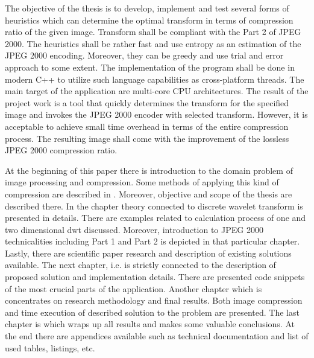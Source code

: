 The objective of the thesis is to develop, implement and test several forms of heuristics which can determine
the optimal transform in terms of compression ratio of the given image. Transform shall be compliant with
the Part 2 of JPEG 2000. The heuristics shall be rather fast and use entropy as an estimation of the JPEG 2000 encoding.
Moreover, they can be greedy and use trial and error approach to some extent. The implementation of the program
shall be done in modern C++ to utilize such language capabilities as cross-platform threads. The main target of the
application are multi-core CPU architectures. The result of the project work is a tool that quickly determines 
the transform for the specified image and invokes the JPEG 2000 encoder with selected transform. However, it is acceptable
to achieve small time overhead in terms of the entire compression process. The resulting image shall come with the
improvement of the lossless JPEG 2000 compression ratio.

At the beginning of this paper there is introduction to the domain problem of image processing and compression.
Some methods of applying this kind of compression are described in . Moreover, objective and scope
of the thesis are described there. In the chapter  theory connected to discrete wavelet transform
is presented in details. There are examples related to calculation process of one and two dimensional dwt discussed.
Moreover, introduction to JPEG 2000 technicalities including Part 1 and Part 2 is depicted in that particular chapter.
Lastly, there are scientific paper research and description of existing solutions available. The next chapter, i.e.
 is strictly connected to the description of proposed solution and implementation details. There are
presented code snippets of the most crucial parts of the application. Another chapter which is 
concentrates on research methodology and final results. Both image compression and time execution of described
solution to the problem are presented.
The last chapter is  which wraps up all results and makes some valuable conclusions.
At the end there are appendices available such as technical documentation and list of used tables, listings, etc.
